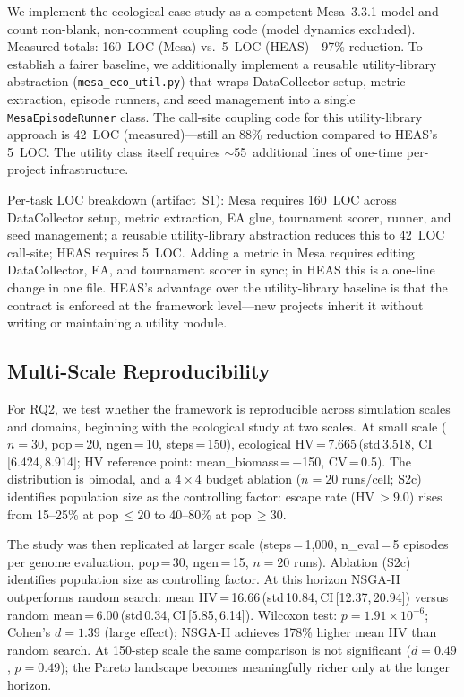 \documentclass{wscpaperproc}
\begin{document}
We implement the ecological case study as a competent Mesa~3.3.1 model and
count non-blank, non-comment coupling code (model dynamics excluded).
Measured totals: 160~LOC (Mesa) vs.\ 5~LOC (HEAS)---97\% reduction.
To establish a fairer baseline, we additionally implement a reusable
utility-library abstraction (\texttt{mesa\_eco\_util.py}) that wraps
DataCollector setup, metric extraction, episode runners, and seed management
into a single \texttt{MesaEpisodeRunner} class. The call-site coupling code
for this utility-library approach is 42~LOC (measured)---still an 88\%
reduction compared to HEAS's 5~LOC. The utility class itself requires
$\sim$55~additional lines of one-time per-project infrastructure.

Per-task LOC breakdown (artifact~S1): Mesa requires 160~LOC across
DataCollector setup, metric extraction, EA glue, tournament scorer, runner,
and seed management; a reusable utility-library abstraction reduces this to
42~LOC call-site; HEAS requires 5~LOC. Adding a metric in Mesa requires
editing DataCollector, EA, and tournament scorer in sync; in HEAS this is a
one-line change in one file. HEAS's advantage over the utility-library baseline
is that the contract is enforced at the framework level---new projects inherit
it without writing or maintaining a utility module.

\subsection{Multi-Scale Reproducibility}
\label{sec:multiscale}

For RQ2, we test whether the framework is reproducible across simulation
scales and domains, beginning with the ecological study at two scales. At small scale
($n\!=\!30$, pop\,=\,20, ngen\,=\,10, steps\,=\,150),
ecological HV\,=\,7.665\,(std\,3.518, CI\,[6.424,\,8.914]; HV reference point:
mean\_biomass\,=\,$-$150, CV\,=\,0.5).
The distribution is bimodal, and a $4\!\times\!4$ budget ablation
($n\!=\!20$ runs/cell; S2c) identifies population size as the controlling
factor: escape rate (HV\,$>\!9.0$) rises from 15--25\% at pop\,$\le\!20$ to
40--80\% at pop\,$\ge\!30$.

The study was then replicated at larger scale
(steps\,=\,1,000, n\_eval\,=\,5 episodes per genome evaluation, pop\,=\,30,
ngen\,=\,15, $n\!=\!20$ runs). Ablation (S2c) identifies population size as
controlling factor. At this horizon NSGA-II outperforms random search: mean HV\,=\,16.66\,(std\,10.84,\,CI\,[12.37,\,20.94])
versus random mean\,=\,6.00\,(std\,0.34,\,CI\,[5.85,\,6.14]).
Wilcoxon test: $p\!=\!1.91\!\times\!10^{-6}$; Cohen's $d\!=\!1.39$
(large effect); NSGA-II achieves 178\% higher mean HV than random search.
At 150-step scale the same comparison is not significant ($d\!=\!0.49$,
$p\!=\!0.49$); the Pareto landscape becomes meaningfully richer only at the
longer horizon.
\end{document}
